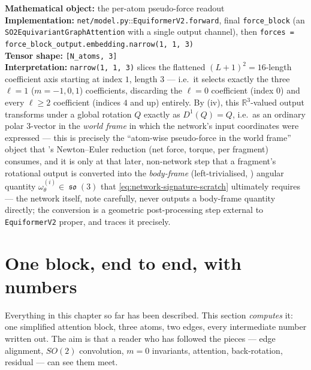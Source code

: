 \documentclass[11pt,a4paper]{report}
\theoremstyle{definition}
\theoremstyle{remark}
\DeclareMathOperator{\so}{\mathfrak{so}}
\newcommand{\RR}{\mathbb R}
\newcommand{\file}[1]{\texttt{#1}}
\newcommand{\pyfunc}[1]{\texttt{#1}}
\newcommand{\shape}[1]{\texttt{[#1]}}
\begin{document}
\begin{codebox}
\textbf{Mathematical object:} the per-atom pseudo-force readout \\
\textbf{Implementation:} \file{net/model.py}::\pyfunc{EquiformerV2.forward},
final \pyfunc{force\_block} (an \pyfunc{SO2EquivariantGraphAttention} with a
single output channel), then
\texttt{forces = force\_block\_output.embedding.narrow(1, 1, 3)} \\
\textbf{Tensor shape:} \shape{N\_atoms, 3} \\
\textbf{Interpretation:} \pyfunc{narrow(1, 1, 3)} slices the flattened
$(L+1)^2=16$-length coefficient axis starting at index $1$, length $3$ ---
i.e.\ it selects exactly the three $\ell=1$ ($m=-1,0,1$) coefficients,
discarding the $\ell=0$ coefficient (index $0$) and every $\ell\ge2$
coefficient (indices $4$ and up) entirely. By
(iv), this $\RR^3$-valued output transforms
under a global rotation $Q$ exactly as $D^1(Q)=Q$, i.e.\ as an ordinary
polar $3$-vector in the \emph{world frame} in which the network's input
coordinates were expressed --- this is precisely the ``atom-wise pseudo-force
in the world frame'' object that 's Newton--Euler
reduction (net force, torque, per fragment) consumes, and it is only at
that later, non-network step that a fragment's rotational output is
converted into the \emph{body-frame} (left-trivialised,
) angular quantity
$\omega^{(i)}_\theta\in\so(3)$ that
\eqref{eq:network-signature-scratch} ultimately requires --- the network
itself, note carefully, never outputs a body-frame quantity directly; the
conversion is a geometric post-processing step external to
\pyfunc{EquiformerV2} proper, and  traces it precisely.
\end{codebox}

\section{One block, end to end, with numbers}
\label{sec:equiformer-worked-example}

Everything in this chapter so far has been described. This section
\emph{computes} it: one simplified attention block, three atoms, two edges,
every intermediate number written out. The aim is that a reader who has
followed the pieces --- edge alignment, $SO(2)$ convolution, $m=0$
invariants, attention, back-rotation, residual --- can see them meet.
\end{document}
